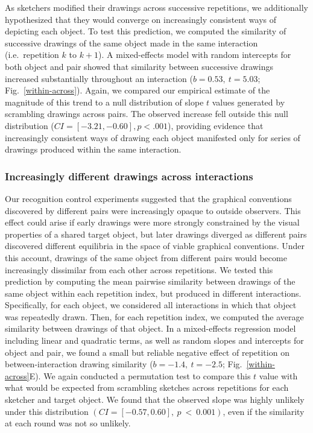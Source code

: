 \documentclass[10pt,letterpaper]{article}
\begin{document}
As sketchers modified their drawings across successive repetitions, we additionally hypothesized that they would converge on increasingly consistent ways of depicting each object.
To test this prediction, we computed the similarity of successive drawings of the same object made in the same interaction (i.e.~repetition $k$ to $k+1$). %
A mixed-effects model with random intercepts for both object and pair showed that similarity between successive drawings increased substantially throughout an interaction ($b = 0.53,~t = 5.03$; Fig.~\ref{within-across}).
Again, we compared our empirical estimate of the magnitude of this trend to a null distribution of slope $t$ values generated by scrambling drawings across pairs.%
The observed increase fell outside this null distribution ($CI = [-3.21, -0.60], p < .001$), providing evidence that increasingly consistent ways of drawing each object manifested only for series of drawings produced within the same interaction.

\subsubsection{Increasingly different drawings across interactions}

Our recognition control experiments suggested that the graphical conventions discovered by different pairs were increasingly opaque to outside observers.
This effect could arise if early drawings were more strongly constrained by the visual properties of a shared target object, but later drawings diverged as different pairs discovered different equilibria in the space of viable graphical conventions.
Under this account, drawings of the same object from different pairs would become increasingly dissimilar from each other across repetitions.
We tested this prediction by computing the mean pairwise similarity between drawings of the same object within each repetition index, but produced in different interactions.
Specifically, for each object, we considered all interactions in which that object was repeatedly drawn.
Then, for each repetition index, we computed the average similarity between drawings of that object.
In a mixed-effects regression model including linear and quadratic terms, as well as random slopes and intercepts for object and pair, we found a small but reliable negative effect of repetition on between-interaction drawing similarity ($b = -1.4, ~t = -2.5$; Fig.~\ref{within-across}E). %
We again conducted a permutation test to compare this $t$ value with what would be expected from scrambling sketches across repetitions for each sketcher and target object.
We found that the observed slope was highly unlikely under this distribution $(CI = [-0.57, 0.60],~p~<~0.001)$, even if the similarity at each round was not so unlikely.
\end{document}
